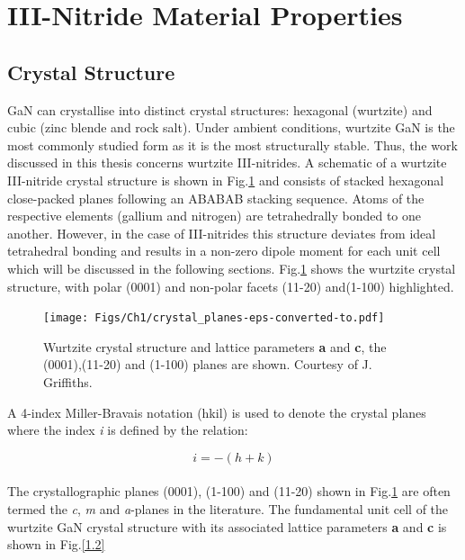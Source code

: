 \section{III-Nitride Material Properties } %

\subsection{Crystal Structure}
\label{section1.1.1}

GaN can crystallise into  distinct crystal structures: hexagonal (wurtzite) and cubic (zinc blende and rock salt). Under ambient conditions, wurtzite GaN is the most commonly studied form as it is the most structurally stable. Thus, the work discussed in this thesis concerns wurtzite III-nitrides. A schematic of a wurtzite III-nitride crystal structure is shown in Fig.\ref{1.1} and consists of stacked hexagonal close-packed planes following an ABABAB stacking sequence. Atoms of the respective elements (gallium and nitrogen) are tetrahedrally bonded to one another. However, in the case of III-nitrides this structure deviates from ideal tetrahedral bonding and results in a non-zero dipole moment for each unit cell which will be discussed in the following sections. Fig.\ref{1.1} shows the wurtzite crystal structure, with polar (0001) and non-polar facets (11-20) and(1-100) highlighted.

\begin{figure}[h]
	\centering
	\texttt{[image: Figs/Ch1/crystal\_planes-eps-converted-to.pdf]}
	\caption {Wurtzite crystal structure and lattice parameters \textbf{a} and \textbf{c}, the (0001),(11-20) and (1-100) planes are shown. Courtesy of J. Griffiths.}
	\label{1.1}
\end{figure}
\FloatBarrier

A 4-index Miller-Bravais notation (hkil) is used to denote the crystal planes where the index {\it i} is defined by the relation:

\begin{equation}
 i = -(h+k)
 \end{equation}
\\
 
The crystallographic planes (0001), (1-100) and (11-20) shown in Fig.\ref{1.1} are often termed the {\it c}, {\it m} and {\it a}-planes in the literature. The fundamental unit cell of the wurtzite GaN crystal structure with its associated lattice parameters \textbf{a} and \textbf{c} is shown in Fig.\ref{1.2}

